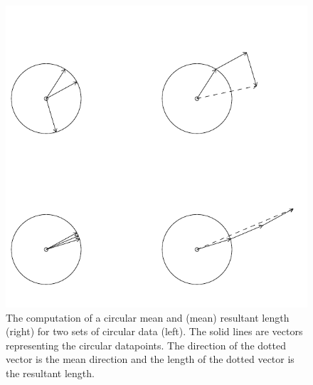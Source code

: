 \documentclass[11pt,]{article}
\begin{document}
\begin{figure}
        \centering

\includegraphics[width=\textwidth]{meanrbar.pdf}

         \caption{The computation of a circular mean and (mean) resultant length (right) for two sets of circular data (left). The solid lines are vectors representing the circular datapoints. The direction of the dotted vector is the mean direction and the length of the dotted vector is the resultant length.}
        \label{meanrbarplot}
\end{figure}
\end{document}
